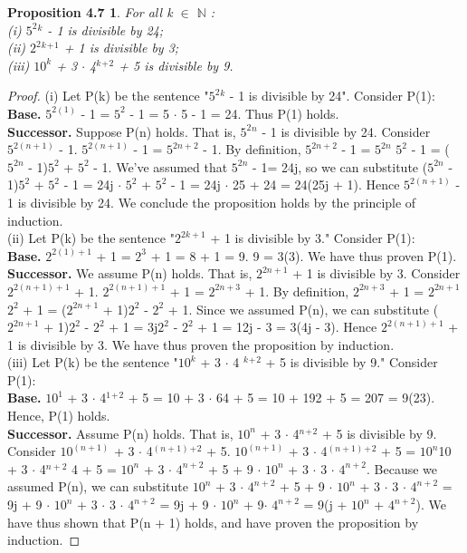 \documentclass[12pt]{amsart}
\newcommand{\N}{\mathbb{N}}
\begin{document}
\newtheorem*{prop4.7}{Proposition 4.7}
\begin{prop4.7}
	For all k $\in$ $\N$ :
	\\(i) $5^2$$^k$ - 1 is divisible by 24;
	\\(ii) $2^2$$^k$$^+$$^1$ + 1 is divisible by 3;
	\\(iii) $10^k$ + 3 $\cdot$ 4$^k$$^+$$^2$ + 5 is divisible by 9.
\end{prop4.7}

\begin{proof}
	(i) Let P(k) be the sentence "$5^2$$^k$ - 1 is divisible by 24". Consider P(1):
	\\\textbf{Base.} $5^{2(1)}$ - 1 = $5^{2}$ - 1 = 5 $\cdot$ 5 - 1 = 24. Thus P(1) holds.
	\\\textbf{Successor.} Suppose P(n) holds. That is, $5^2$$^n$ - 1 is divisible by 24. Consider $5^{2(n + 1)}$ - 1. $5^{2(n + 1)}$ - 1 = $5^{2n + 2}$ - 1. By definition, $5^{2n + 2}$ - 1 = $5^{2n}$ $5^{2}$ - 1 = ($5^{2n}$ - 1)$5^{2}$ + $5^{2}$ - 1. We've assumed that $5^{2n}$ - 1= 24j, so we can substitute ($5^{2n}$ - 1)$5^{2}$ + $5^{2}$ - 1 =  24j $\cdot$ $5^{2}$ + $5^{2}$ - 1 = 24j $\cdot$ 25 + 24 = 24(25j + 1). Hence $5^{2(n + 1)}$ - 1 is divisible by 24. We conclude the proposition holds by the principle of induction.
	\\(ii) Let P(k) be the sentence "$2^{2k + 1}$ + 1 is divisible by 3." Consider P(1):
	\\\textbf{Base.} $2^{2(1) + 1}$ + 1 = $2^{3}$ + 1 = 8 + 1 = 9. 9 = 3(3). We have thus proven P(1).
	\\\textbf{Successor.} We assume P(n) holds. That is, $2^{2n + 1}$ + 1 is divisible by 3. Consider $2^{2(n + 1) + 1}$ + 1. $2^{2(n + 1) + 1}$ + 1 = $2^{2n + 3}$ + 1. By definition, $2^{2n + 3}$ + 1 = $2^{2n+1}$$2^{2}$ + 1 = ($2^{2n+1}$ + 1)$2^{2}$ - $2^{2}$ + 1. Since we assumed P(n), we can substitute ($2^{2n+1}$ + 1)$2^{2}$ - $2^{2}$ + 1 = 3j$2^{2}$ - $2^{2}$ + 1 = 12j - 3 = 3(4j - 3). Hence $2^{2(n + 1) + 1}$ + 1 is divisible by 3. We have thus proven the proposition by induction.
	\\(iii) Let P(k) be the sentence "$10^k$ + 3 $\cdot$ 4 $^k$$^+$$^2$ + 5 is divisible by 9." Consider P(1):
	\\\textbf{Base.} $10^1$ + 3 $\cdot$ 4$^1$$^+$$^2$ + 5 = 10 + 3 $\cdot$ 64 + 5 = 10 + 192 + 5 = 207 = 9(23). Hence, P(1) holds.
	\\\textbf{Successor.} Assume P(n) holds. That is, $10^n$ + 3 $\cdot$ 4$^n$$^+$$^2$ + 5 is divisible by 9. Consider $10^{(n + 1)}$ + 3 $\cdot$ 4$^{(n + 1)}$$^+$$^2$ + 5. $10^{(n + 1)}$ + 3 $\cdot$ 4$^{(n + 1)}$$^+$$^2$ + 5 = $10^{n}$10 + 3 $\cdot$ 4$^{n + 2}$ 4 + 5 = $10^n$ + 3 $\cdot$ $4^{n+2}$ + 5 + 9 $\cdot$ $10^{n}$ + 3 $\cdot$ 3 $\cdot$ $4^{n+2}$. Because we assumed P(n), we can substitute $10^n$ + 3 $\cdot$ $4^{n+2}$ + 5 + 9 $\cdot$ $10^{n}$ + 3 $\cdot$ 3 $\cdot$ $4^{n+2}$ = 9j + 9 $\cdot$ $10^{n}$ + 3 $\cdot$ 3 $\cdot$ $4^{n+2}$  = 9j + 9 $\cdot$ $10^{n}$ +  9$\cdot$ $4^{n+2}$ = 9(j + $10^{n}$ +  $4^{n+2}$). We have thus shown that P(n + 1) holds, and have proven the proposition by induction.
\end{proof}
\end{document}
